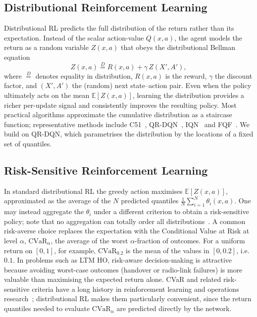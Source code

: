 \documentclass[conference]{IEEEtran}
\begin{document}
\subsection{Distributional Reinforcement Learning}
\label{sec:rel-distrl}
Distributional RL predicts the full distribution of the return rather than its
expectation. Instead of the scalar action-value $Q(x,a)$, the agent models the
return as a random variable $Z(x,a)$ that obeys the distributional Bellman
equation
\begin{equation}
Z(x,a) \overset{D}{=} R(x,a) + \gamma\,Z(X',A'),
\label{eq:dist-bellman}
\end{equation}
where $\overset{D}{=}$ denotes equality in distribution, $R(x,a)$ is the
reward, $\gamma$ the discount factor, and $(X',A')$ the (random) next
state--action pair. Even when the policy ultimately acts on the mean
$\mathbb{E}[Z(x,a)]$, learning the distribution provides a richer per-update
signal and consistently improves the resulting policy. Most practical
algorithms approximate the cumulative distribution as a staircase function;
representative methods include C51~\cite{c51}, QR-DQN~\cite{qrdqn},
IQN~\cite{iqn} and FQF~\cite{fqf}. We build on QR-DQN, which parametrises the
distribution by the locations of a fixed set of quantiles.

\subsection{Risk-Sensitive Reinforcement Learning}
\label{sec:rel-risk}
In standard distributional RL the greedy action maximises
$\mathbb{E}[Z(x,a)]$, approximated as the average of the $N$ predicted quantiles
$\tfrac{1}{N}\sum_{i=1}^{N}\theta_i(x,a)$. One may instead aggregate the
$\theta_i$ under a different criterion to obtain a risk-sensitive policy; note
that no aggregation can totally order all distributions~\cite{rockafellar}.
A common risk-averse choice replaces the expectation with the Conditional
Value at Risk at level $\alpha$, $\mathrm{CVaR}_\alpha$, the average of the
worst $\alpha$-fraction of outcomes. For a uniform return on $[0,1]$, for
example, $\mathrm{CVaR}_{0.2}$ is the mean of the values in $[0,0.2]$, i.e.\
$0.1$. In problems such as LTM HO, risk-aware decision-making is attractive
because avoiding worst-case outcomes (handover or radio-link failures) is more
valuable than maximising the expected return alone. CVaR and related
risk-sensitive criteria have a long history in reinforcement learning and
operations research~\cite{chow2014,tamar2015}; distributional RL makes them
particularly convenient, since the return quantiles needed to evaluate
$\mathrm{CVaR}_\alpha$ are predicted directly by the network.
\end{document}
